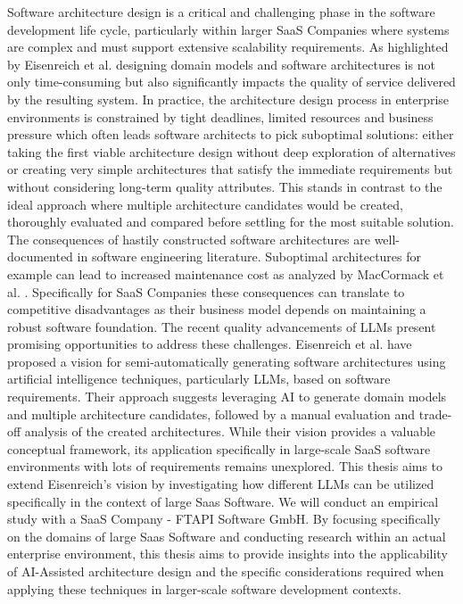 \documentclass[12pt,a4paper]{article}
\begin{document}
Software architecture design is a critical and challenging phase in the software development life cycle, particularly within larger SaaS Companies where systems are complex and must support extensive scalability requirements. As highlighted by Eisenreich et al. \autocite{eisenreich2024} designing domain models and software architectures is not only time-consuming but also significantly impacts the quality of service delivered by the resulting system. \newline In practice, the architecture design process in enterprise environments is constrained by tight deadlines, limited resources and business pressure which often leads software architects to pick suboptimal solutions: either taking the first viable architecture design without deep exploration of alternatives or creating very simple architectures that satisfy the immediate requirements but without considering long-term quality attributes. This stands in contrast to the ideal approach where multiple architecture candidates would be created, thoroughly evaluated and compared before settling for the most suitable solution. \newline The consequences of hastily constructed software architectures are well-documented in software engineering literature. Suboptimal architectures for example can lead to increased maintenance cost as analyzed by MacCormack et al. \autocite{MACCORMACK2016170}. Specifically for SaaS Companies these consequences can translate to competitive disadvantages as their business model depends on maintaining a robust software foundation. \newline The recent quality advancements of LLMs present promising opportunities to address these challenges. Eisenreich et al. \cite{eisenreich2024} have proposed a vision for semi-automatically generating software architectures using artificial intelligence techniques, particularly LLMs, based on software requirements. Their approach suggests leveraging AI to generate domain models and multiple architecture candidates, followed by a manual evaluation and trade-off analysis of the created architectures. \newline While their vision provides a valuable conceptual framework, its application specifically in large-scale SaaS software environments with lots of requirements remains unexplored. \newline
This thesis aims to extend Eisenreich's vision by investigating how different LLMs can be utilized specifically in the context of large Saas Software. We will conduct an empirical study with a SaaS Company - FTAPI Software GmbH. By focusing specifically on the domains of large Saas Software and conducting research within an actual enterprise environment, this thesis aims to provide insights into the applicability of AI-Assisted architecture design and the specific considerations required when applying these techniques in larger-scale software development contexts.
\end{document}
